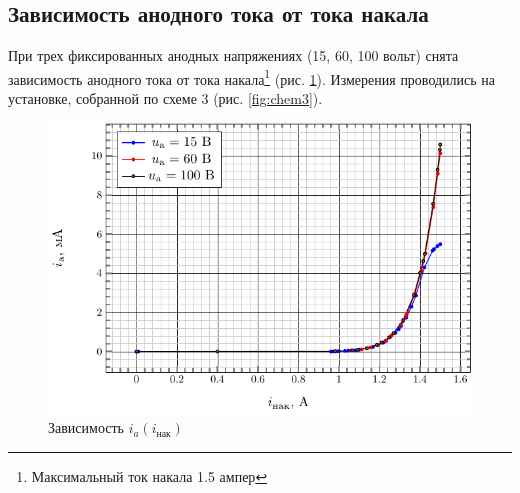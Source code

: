 \documentclass[a5paper,11pt]{extarticle}
\begin{document}
\subsection{Зависимость анодного тока от тока накала}
 При трех фиксированных анодных напряжениях (15, 60, 100 вольт) снята зависимость анодного тока от тока накала\footnote{Максимальный ток накала 1.5 ампер} (рис. \ref{fig:iia}). Измерения проводились на установке, собранной по схеме 3 (рис. \ref{fig:chem3}).
\begin{figure}[H]
	\centering
	\includegraphics[]{fig/i_from_ia.pdf}
	\caption{Зависимость $i_a(i_\text{нак})$}
	\label{fig:iia}
\end{figure}
\end{document}
